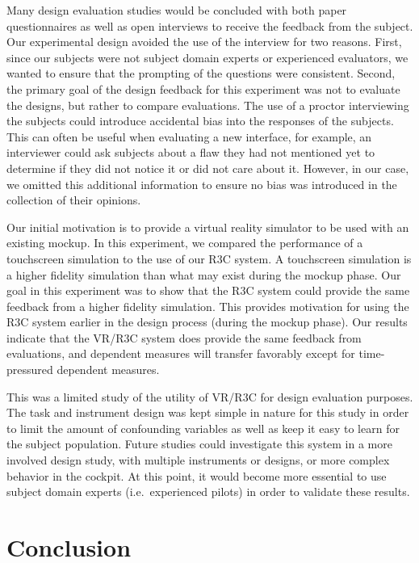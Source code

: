 Many design evaluation studies would be concluded with both paper questionnaires as well as open interviews to receive the feedback from the subject.
Our experimental design avoided the use of the interview for two reasons.
First, since our subjects were not subject domain experts or experienced evaluators, we wanted to ensure that the prompting of the questions were consistent.
Second, the primary goal of the design feedback for this experiment was not to evaluate the designs, but rather to compare evaluations.
The use of a proctor interviewing the subjects could introduce accidental bias into the responses of the subjects.
This can often be useful when evaluating a new interface, for example, an interviewer could ask subjects about a flaw they had not mentioned yet to determine if they did not notice it or did not care about it.
However, in our case, we omitted this additional information to ensure no bias was introduced in the collection of their opinions.

Our initial motivation is to provide a virtual reality simulator to be used with an existing mockup.
In this experiment, we compared the performance of a touchscreen simulation to the use of our R3C system.
A touchscreen simulation is a higher fidelity simulation than what may exist during the mockup phase.
Our goal in this experiment was to show that the R3C system could provide the same feedback from a higher fidelity simulation.
This provides motivation for using the R3C system earlier in the design process (during the mockup phase).
Our results indicate that the VR/R3C system does provide the same feedback from evaluations, and dependent measures will transfer favorably except for time-pressured dependent measures.

This was a limited study of the utility of VR/R3C for design evaluation purposes.
The task and instrument design was kept simple in nature for this study in order to limit the amount of confounding variables as well as keep it easy to learn for the subject population.
Future studies could investigate this system in a more involved design study, with multiple instruments or designs, or more complex behavior in the cockpit.
At this point, it would become more essential to use subject domain experts (i.e.\ experienced pilots) in order to validate these results.

\section{Conclusion}

